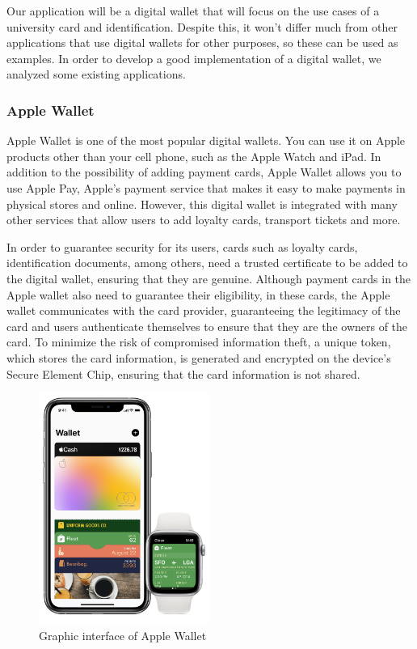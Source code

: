 \documentclass[10pt]{article}
\begin{document}
Our application will be a digital wallet that will focus on the use cases of a university card and identification. Despite this, it won't differ much from other applications that use digital wallets for other purposes, so these can be used as examples. In order to develop a good implementation of a digital wallet, we analyzed some existing applications.

\subsubsection{Apple Wallet}
Apple Wallet is one of the most popular digital wallets. You can use it on Apple products other than your cell phone, such as the Apple Watch and iPad. In addition to the possibility of adding payment cards, Apple Wallet allows you to use Apple Pay, Apple's payment service that makes it easy to make payments in physical stores and online. However, this digital wallet is integrated with many other services that allow users to add loyalty cards, transport tickets and more.

In order to guarantee security for its users, cards such as loyalty cards, identification documents, among others, need a trusted certificate to be added to the digital wallet, ensuring that they are genuine.
Although payment cards in the Apple wallet also need to guarantee their eligibility, in these cards, the Apple wallet communicates with the card provider, guaranteeing the legitimacy of the card and users authenticate themselves to ensure that they are the owners of the card. To minimize the risk of compromised information theft, a unique token, which stores the card information, is generated and encrypted on the device's Secure Element Chip, ensuring that the card information is not shared.

\begin{figure}[H]
    \centering
    \includegraphics[width=0.5\textwidth]{report-images/apple-wallet.png}
    \caption{Graphic interface of Apple Wallet}
    \label{fig:fig-1}
\end{figure}
\end{document}
